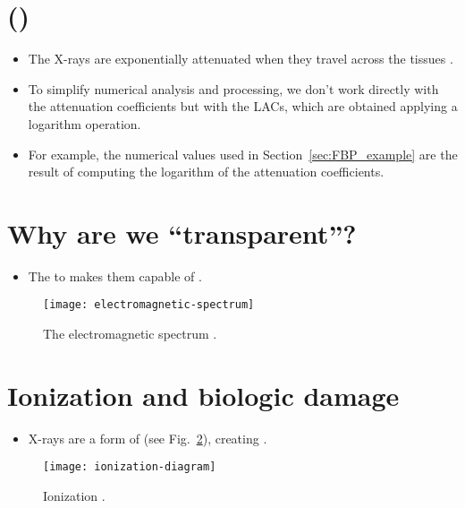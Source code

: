 \section{ ()}
\begin{itemize}
\item The X-rays are
  exponentially attenuated when they travel across the tissues \cite{wikipedia_LAC}.
\item To simplify numerical analysis and processing, we don't work
  directly with the attenuation coefficients but with the \glspl{LAC}, which
  are obtained applying a logarithm operation.
\item For example, the numerical values used in
  Section~\ref{sec:FBP_example} are the result of computing the
  logarithm of the 
  attenuation coefficients.
\end{itemize}

\section{Why are we ``transparent''?}
\begin{itemize}
\item The  to  makes them capable of .
\end{itemize}
\vspace{-1ex}
\begin{figure}[!h]
  \centering
  \texttt{[image: electromagnetic-spectrum]}
  \caption{The electromagnetic spectrum
    \cite{X-rays_in_spectrum}.\label{fig:X-rays_in_spectrum}}
\end{figure}

\section{Ionization and biologic damage}
\begin{itemize}
\item X-rays are a form of  (see Fig.~\ref{fig:ionization}), creating
  .
\end{itemize}
\vspace{-1ex}
\begin{figure}[!h]
  \centering
  \texttt{[image: ionization-diagram]}
  \caption{Ionization
    \cite{Perakende_ionization}.\label{fig:ionization}}
\end{figure}

